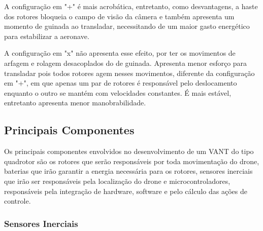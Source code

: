 A configuração em "+" é mais acrobática, entretanto, como desvantagens, a haste dos rotores bloqueia o campo de visão da câmera e também apresenta um momento de guinada ao transladar, necessitando de um maior gasto energético para estabilizar a aeronave.

A configuração em "x" não apresenta esse efeito, por ter os movimentos de arfagem e rolagem desacoplados do de guinada. Apresenta menor esforço para transladar pois todos rotores agem nesses movimentos, diferente da configuração em "+", em que apenas um par de rotores é responsável pelo deslocamento enquanto o outro se mantém com velocidades constantes. É mais estável, entretanto apresenta menor manobrabilidade. \cite{NorouziGhazbi2016}


\subsection{Principais Componentes}

Os principais componentes envolvidos no desenvolvimento de um VANT do tipo quadrotor são os rotores que serão responsáveis por toda movimentação do drone, baterias que irão garantir a energia necessária para os rotores, sensores inerciais que irão ser responsáveis pela localização do drone e microcontroladores, responsáveis pela integração de hardware, software e pelo cálculo das ações de controle.

\subsubsection{Sensores Inerciais}

